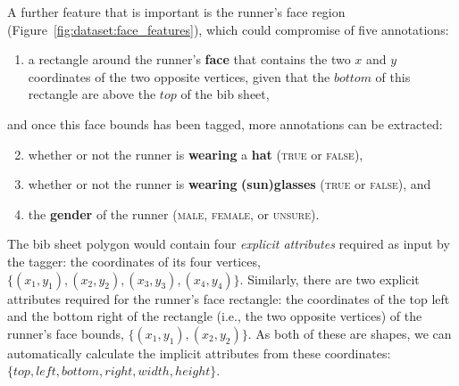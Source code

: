 A further feature that is important is the runner's face region (Figure~\ref{fig:dataset:face_features}), which could compromise of five annotations:

\begin{enumerate}
  \item a rectangle around the runner's \textbf{face} that contains the two $x$ and $y$ coordinates of the two opposite vertices, given that the $bottom$ of this rectangle are above the $top$ of the bib sheet,
\end{enumerate}

\noindent
and once this face bounds has been tagged, more annotations can be extracted:

\begin{enumerate}
  \setcounter{enumi}{1}
  \item whether or not the runner is \textbf{wearing} a \textbf{hat} (\textsc{true} or \textsc{false}),
  \item whether or not the runner is \textbf{wearing} \textbf{(sun)glasses} (\textsc{true} or \textsc{false}), and
  \item the \textbf{gender} of the runner (\textsc{male}, \textsc{female}, or \textsc{unsure}).
\end{enumerate}

The bib sheet polygon would contain four \textit{explicit attributes} required as input by the tagger: the coordinates of its four vertices, $\{ (x_{1}, y_{1}), (x_{2}, y_{2}), (x_{3}, y_{3}), (x_{4}, y_{4}) \}$. Similarly, there are two explicit attributes required for the runner's face rectangle: the coordinates of the top left and the bottom right of the rectangle (i.e., the two opposite vertices) of the runner's face bounds, $\{ (x_{1}, y_{1}), (x_{2}, y_{2}) \}$. As both of these are shapes, we can automatically calculate the implicit attributes from these coordinates:  $\{ top, left, bottom, right, width, height \}$.

